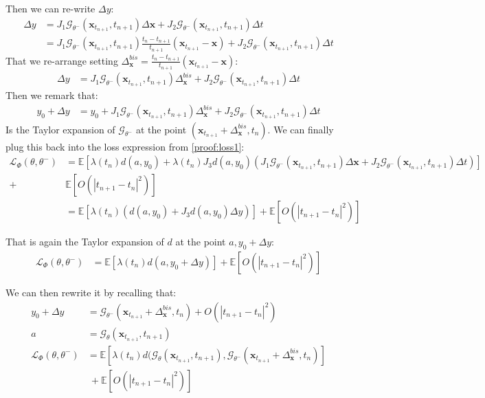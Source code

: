 \noindent Then we can re-write $\Delta y$:
\begin{align}
    \Delta y & = J_1\mathcal{G}_{\theta^-}(\mathbf{x}_{t_{n+1}}, t_{n+1})\Delta \mathbf{x} + J_2\mathcal{G}_{\theta^-}(\mathbf{x}_{t_{n+1}}, t_{n+1})\Delta t \\
    & = J_1\mathcal{G}_{\theta^-}(\mathbf{x}_{t_{n+1}}, t_{n+1})\frac{t_n - t_{n+1} }{t_{n+1}}(\mathbf{x}_{t_{n +1}} - \mathbf{x}) + J_2\mathcal{G}_{\theta^-}(\mathbf{x}_{t_{n+1}}, t_{n+1})\Delta t
\end{align}
\noindent That we re-arrange setting $\Delta_{\mathbf{x}}^{bis} = \frac{t_n - t_{n+1} }{t_{n+1}}(\mathbf{x}_{t_{n +1}} - \mathbf{x})$:
\begin{align}
    \Delta y & = J_1\mathcal{G}_{\theta^-}(\mathbf{x}_{t_{n+1}}, t_{n+1}) \Delta_{\mathbf{x}}^{bis} + J_2\mathcal{G}_{\theta^-}(\mathbf{x}_{t_{n+1}}, t_{n+1})\Delta t
\end{align}
\noindent Then we remark that:
\begin{align}
    y_0 + \Delta y & = y_0 + J_1\mathcal{G}_{\theta^-}(\mathbf{x}_{t_{n+1}}, t_{n+1}) \Delta_{\mathbf{x}}^{bis} + J_2\mathcal{G}_{\theta^-}(\mathbf{x}_{t_{n+1}}, t_{n+1})\Delta t
\end{align}
\noindent Is the Taylor expansion of $\mathcal{G}_{\theta^-}$ at the point $(\mathbf{x}_{t_{n+1}} + \Delta_{\mathbf{x}}^{bis}, t_n)$. 
\noindent We can finally plug this back into the loss expression from \ref{proof:loss1}:
\begin{align}
    \mathcal{L}_{\Phi}(\theta, \theta^-) &= \mathbb{E}\left[ \lambda(t_n) d(a, y_0) + \lambda(t_n) J_3 d(a, y_0) (J_1\mathcal{G}_{\theta^-}(\mathbf{x}_{t_{n+1}}, t_{n+1})\Delta \mathbf{x} + J_2\mathcal{G}_{\theta^-}(\mathbf{x}_{t_{n+1}}, t_{n+1})\Delta t )\right] \\
    + & \mathbb{E}\left[O(|t_{n+1} - t_n |^2) \right] \\
    & = \mathbb{E}\left[ \lambda(t_n) ( d(a, y_0) + J_3 d(a, y_0) \Delta y)\right] + \mathbb{E}\left[O(|t_{n+1} - t_n |^2) \right]
\end{align}

\noindent That is again the Taylor expansion of $d$ at the point $a , y_0 + \Delta y$:
\begin{align}
    \mathcal{L}_{\Phi}(\theta, \theta^-) & = \mathbb{E}\left[ \lambda(t_n) d(a, y_0 + \Delta y) \right] + \mathbb{E}\left[O(|t_{n+1} - t_n |^2) \right] 
\end{align}

\noindent We can then rewrite it by recalling that:
\begin{align}
    y_0 + \Delta y & = \mathcal{G}_{\theta^-}(\mathbf{x}_{t_{n+1}} + \Delta_{\mathbf{x}}^{bis}, t_n) + O(|t_{n+1} - t_n|^2) \\
    a & = \mathcal{G}_{\theta}(\mathbf{x}_{t_{n+1}}, t_{n+1}) \\
   \mathcal{L}_{\Phi}(\theta, \theta^-) & = \mathbb{E}\left[ \lambda(t_n) d(\mathcal{G}_{\theta}(\mathbf{x}_{t_{n+1}}, t_{n+1}), \mathcal{G}_{\theta^-}(\mathbf{x}_{t_{n+1}} + \Delta_{\mathbf{x}}^{bis}, t_n) \right] \\
   & \: + \mathbb{E}\left[O(|t_{n+1} - t_n |^2) \right]  
\end{align}

